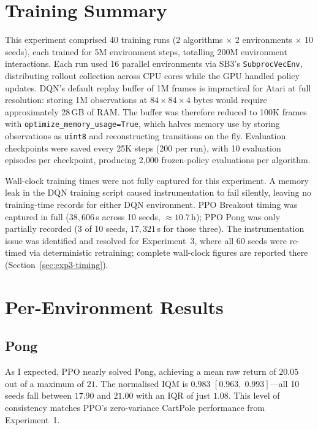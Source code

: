 \section{Training Summary}
\label{sec:atari-training}

{\color{red} This experiment comprised 40 training runs (2 algorithms $\times$ 2 environments $\times$ 10 seeds), each trained for 5M environment steps, totalling 200M environment interactions. Each run used 16 parallel environments via SB3's \texttt{SubprocVecEnv}, distributing rollout collection across CPU cores while the GPU handled policy updates. DQN's default replay buffer of 1M frames is impractical for Atari at full resolution: storing 1M observations at $84 \times 84 \times 4$ bytes would require approximately 28\,GB of RAM. The buffer was therefore reduced to 100K frames with \texttt{optimize\_memory\_usage=True}, which halves memory use by storing observations as \texttt{uint8} and reconstructing transitions on the fly. Evaluation checkpoints were saved every 25K steps (200 per run), with 10 evaluation episodes per checkpoint, producing 2{,}000 frozen-policy evaluations per algorithm.}

{\color{red} Wall-clock training times were not fully captured for this experiment. A memory leak in the DQN training script caused instrumentation to fail silently, leaving no training-time records for either DQN environment. PPO Breakout timing was captured in full ($38{,}606$\,s across 10 seeds, ${\approx}10.7$\,h); PPO Pong was only partially recorded (3 of 10 seeds, $17{,}321$\,s for those three). The instrumentation issue was identified and resolved for Experiment~3, where all 60 seeds were re-timed via deterministic retraining; complete wall-clock figures are reported there (Section~\ref{sec:exp3-timing}).}

\section{Per-Environment Results}
\label{sec:atari-per-env}

\subsection{Pong}
\label{sec:pong}

As I expected, PPO nearly solved Pong, achieving a mean raw return of $20.05$ out of
a maximum of $21$. The normalised IQM is $0.983$
$[0.963,\;0.993]$---all 10 seeds fall between $17.90$ and $21.00$
with an IQR of just $1.08$. This level of consistency matches PPO's
zero-variance CartPole performance from Experiment~1.

